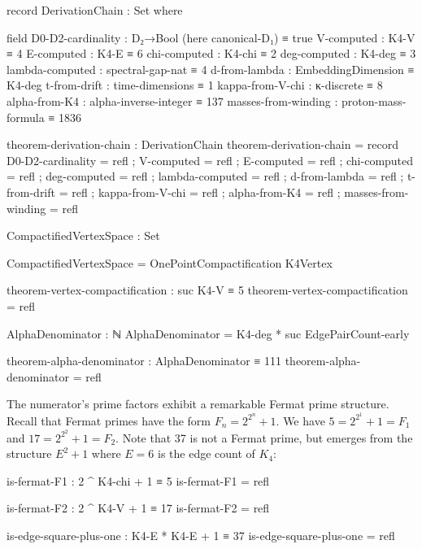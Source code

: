 \documentclass[11pt,a4paper]{book}
\begin{document}
\begin{code}
record DerivationChain : Set where

  field
    D0-D2-cardinality    : D₂→Bool (here canonical-D₁) ≡ true
    V-computed           : K4-V ≡ 4
    E-computed           : K4-E ≡ 6
    chi-computed         : K4-chi ≡ 2
    deg-computed         : K4-deg ≡ 3
    lambda-computed      : spectral-gap-nat ≡ 4
    d-from-lambda        : EmbeddingDimension ≡ K4-deg
    t-from-drift         : time-dimensions ≡ 1
    kappa-from-V-chi     : κ-discrete ≡ 8
    alpha-from-K4        : alpha-inverse-integer ≡ 137
    masses-from-winding  : proton-mass-formula ≡ 1836

theorem-derivation-chain : DerivationChain
theorem-derivation-chain = record
  { D0-D2-cardinality    = refl
  ; V-computed           = refl
  ; E-computed           = refl
  ; chi-computed         = refl
  ; deg-computed         = refl
  ; lambda-computed      = refl
  ; d-from-lambda        = refl
  ; t-from-drift         = refl
  ; kappa-from-V-chi     = refl
  ; alpha-from-K4        = refl
  ; masses-from-winding  = refl
  }
\end{code}

\begin{code}
CompactifiedVertexSpace : Set

CompactifiedVertexSpace = OnePointCompactification K4Vertex

theorem-vertex-compactification : suc K4-V ≡ 5
theorem-vertex-compactification = refl
\end{code}

\begin{code}
AlphaDenominator : ℕ
AlphaDenominator = K4-deg * suc EdgePairCount-early

theorem-alpha-denominator : AlphaDenominator ≡ 111
theorem-alpha-denominator = refl
\end{code}

The numerator's prime factors exhibit a remarkable Fermat prime structure. Recall that 
Fermat primes have the form $F_n = 2^{2^n} + 1$. We have $5 = 2^{2^1} + 1 = F_1$ and 
$17 = 2^{2^2} + 1 = F_2$. Note that 37 is not a Fermat prime, but emerges from 
the structure $E^2 + 1$ where $E = 6$ is the edge count of $K_4$:

\begin{code}
is-fermat-F1 : 2 ^ K4-chi + 1 ≡ 5
is-fermat-F1 = refl

is-fermat-F2 : 2 ^ K4-V + 1 ≡ 17
is-fermat-F2 = refl

is-edge-square-plus-one : K4-E * K4-E + 1 ≡ 37
is-edge-square-plus-one = refl
\end{code}
\end{document}
